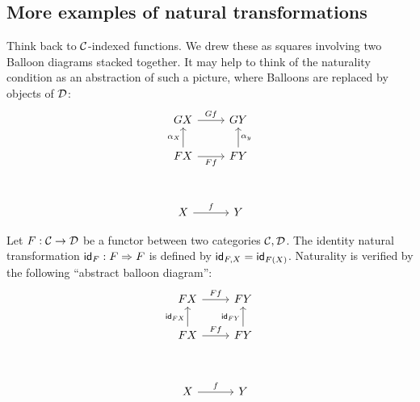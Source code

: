 \subsection{More examples of natural transformations}

Think back to \(\mathcal C\)-indexed functions. We drew these as squares involving two Balloon diagrams stacked together.
It may help to think of the naturality condition as an abstraction of such a picture, where Balloons are replaced by
objects of \(\mathcal D\):
\[%
\begin{tikzcd}
GX \arrow[r, "Gf"]                        & GY                        \\
FX \arrow[r, "Ff"'] \arrow[u, "\alpha_X"] & FY \arrow[u, "\alpha_y"'] \\
                                          &                           \\
X \arrow[r, "f"]                          & Y
\end{tikzcd}\]

\begin{definition}
  Let \(F : \mathcal C \to \mathcal D\) be a functor between two categories \(\mathcal C,\mathcal D\).
  The identity natural transformation \(\mathsf{id}_F : F \Rightarrow F\)
  is defined by \(\mathsf{id}_{F,X} = \mathsf{id}_{F(X)}\).
  Naturality is verified by the following ``abstract balloon diagram'':
  \[%
\begin{tikzcd}
FX \arrow[r, "Ff"]                        & FY                        \\
FX \arrow[r, "Ff"] \arrow[u, "\idt_{FX}"] & FY \arrow[u, "\idt_{FY}"] \\
                                          &                           \\
X \arrow[r, "f"]                          & Y
\end{tikzcd}\]
\end{definition}

